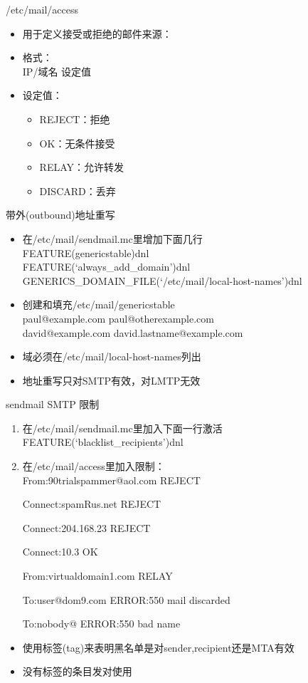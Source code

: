 \begin{frame}{/etc/mail/access}
\begin{itemize}
\item 用于定义接受或拒绝的邮件来源：
\item 格式：\\
IP/域名 设定值
\item 设定值：

\begin{itemize}
\item REJECT：拒绝
\item OK：无条件接受
\item RELAY：允许转发
\item DISCARD：丢弃
\end{itemize}
\end{itemize}

\end{frame} 
\begin{frame}{带外(outbound)地址重写}
\begin{itemize}
\item 在/etc/mail/sendmail.mc里增加下面几行\\
FEATURE(genericstable)dnl\\
FEATURE(`always\_add\_domain')dnl\\
GENERICS\_DOMAIN\_FILE(`/etc/mail/local-host-names')dnl
\item 创建和填充/etc/mail/genericstable\\
paul@example.com paul@otherexample.com\\
david@example.com david.lastname@example.com
\item 域必须在/etc/mail/local-host-names列出
\item 地址重写只对SMTP有效，对LMTP无效
\end{itemize}

\end{frame} 
\begin{frame}{sendmail SMTP 限制}
\begin{enumerate}
\item 在/etc/mail/sendmail.mc里加入下面一行激活\\
FEATURE(`blacklist\_recipients')dnl
\item 在/etc/mail/access里加入限制：\\
From:90trialspammer@aol.com REJECT

Connect:spamRus.net REJECT

Connect:204.168.23 REJECT

Connect:10.3 OK

From:virtualdomain1.com RELAY

To:user@dom9.com ERROR:550 mail discarded

To:nobody@ ERROR:550 bad name

\end{enumerate}
\begin{itemize}
\item 使用标签(tag)来表明黑名单是对sender,recipient还是MTA有效
\item 没有标签的条目发对使用
\end{itemize}

\end{frame} 
